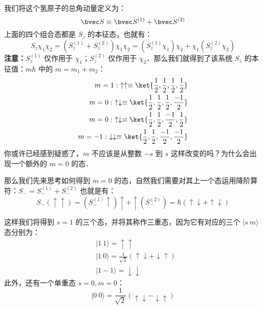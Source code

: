 我们将这个氢原子的总角动量定义为：
\begin{equation}
\bvec S \equiv \bvec S^{(1)}+\bvec S^{(2)}
\end{equation}
上面的四个组合态都是 $S_z$ 的本征态，也就有：
\begin{equation}
S_z\chi_1\chi_2=(S_z^{(1)}+S_z^{(2)})\chi_1\chi_2=(S_z^{(1)}\chi_1)\chi_2+\chi_1(S_z^{(2)}\chi_2)
\end{equation}
\textbf{注意：}$S_z^{(1)}$ 仅作用于 $\chi_1$；$S_z^{(2)}$ 仅作用于 $\chi_2$．那么我们就得到了该系统 $S_z$ 的本征值：$m\hbar$ 中的 $m=m_1+m_2$：
\begin{align}
m=1: \ \uparrow\uparrow\equiv \ket{\frac{1}{2},\frac{1}{2},\frac{1}{2},\frac{1}{2}}\\
m=0: \ \uparrow\downarrow\equiv \ket{\frac{1}{2},\frac{1}{2},\frac{1}{2},\frac{-1}{2}}\\
m=0: \ \uparrow\downarrow\equiv \ket{\frac{1}{2},\frac{1}{2},\frac{-1}{2},\frac{1}{2}}\\ 
m=-1:\ \downarrow\downarrow\equiv \ket{\frac{1}{2},\frac{1}{2},\frac{-1}{2},\frac{-1}{2}}
\end{align}
你或许已经感到疑惑了，$m$ 不应该是从整数 $-s$ 到 $s$ 这样改变的吗？为什么会出现一个额外的 $m=0$ 的态．

那么我们先来思考如何得到 $m=0$ 的态，自然我们需要对其上一个态运用降阶算符：$S_-=S_-^{(1)}+S_-^{(2)}$ 也就是有：
\begin{equation}
S_-(\uparrow\uparrow)=(S_-^{(1)}\uparrow)\uparrow+\uparrow(S_-^{(2)})=\hbar(\uparrow\downarrow+\uparrow\downarrow)
\end{equation}

这样我们将得到 $s=1$ 的三个态，并将其称作三重态，因为它有对应的三个 $|s\ m\rangle$ 态分别为：
\begin{align}
&|1 \ 1\rangle =\uparrow\uparrow\\
&|1 \ 0\rangle=\frac{1}{\sqrt{2}}(\uparrow\downarrow+\downarrow\uparrow)\\
&|1 -1\rangle=\downarrow\downarrow
\end{align}
此外，还有一个单重态 $s=0,m=0$：
\begin{equation}
|0\ 0\rangle = \frac{1}{\sqrt{2}}(\uparrow\downarrow-\downarrow\uparrow)
\end{equation}

